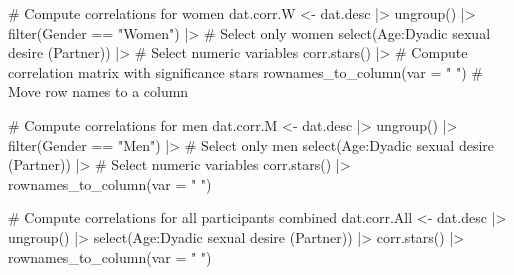 \documentclass[
  bookmarksnumbered]{article}
\newenvironment{Shaded}{\begin{snugshade}}{\end{snugshade}}
\newcommand{\AttributeTok}[1]{\textcolor[rgb]{0.80,0.80,0.80}{#1}}
\newcommand{\CommentTok}[1]{\textcolor[rgb]{0.50,0.62,0.50}{#1}}
\newcommand{\FunctionTok}[1]{\textcolor[rgb]{0.94,0.94,0.56}{#1}}
\newcommand{\NormalTok}[1]{\textcolor[rgb]{0.80,0.80,0.80}{#1}}
\newcommand{\OtherTok}[1]{\textcolor[rgb]{0.94,0.94,0.56}{#1}}
\newcommand{\SpecialCharTok}[1]{\textcolor[rgb]{0.86,0.64,0.64}{#1}}
\newcommand{\StringTok}[1]{\textcolor[rgb]{0.80,0.58,0.58}{#1}}
\begin{document}
\begin{Shaded}
\begin{Highlighting}[]
\CommentTok{\# Compute correlations for women}
\NormalTok{dat.corr.W }\OtherTok{\textless{}{-}}\NormalTok{ dat.desc }\SpecialCharTok{|\textgreater{}}
  \FunctionTok{ungroup}\NormalTok{() }\SpecialCharTok{|\textgreater{}}
  \FunctionTok{filter}\NormalTok{(Gender }\SpecialCharTok{==} \StringTok{"Women"}\NormalTok{) }\SpecialCharTok{|\textgreater{}} \CommentTok{\# Select only women}
  \FunctionTok{select}\NormalTok{(Age}\SpecialCharTok{:}\StringTok{\textasciigrave{}}\AttributeTok{Dyadic sexual desire (Partner)}\StringTok{\textasciigrave{}}\NormalTok{) }\SpecialCharTok{|\textgreater{}} \CommentTok{\# Select numeric variables}
  \FunctionTok{corr.stars}\NormalTok{() }\SpecialCharTok{|\textgreater{}} \CommentTok{\# Compute correlation matrix with significance stars}
  \FunctionTok{rownames\_to\_column}\NormalTok{(}\AttributeTok{var =} \StringTok{" "}\NormalTok{) }\CommentTok{\# Move row names to a column}

\CommentTok{\# Compute correlations for men}
\NormalTok{dat.corr.M }\OtherTok{\textless{}{-}}\NormalTok{ dat.desc }\SpecialCharTok{|\textgreater{}}
  \FunctionTok{ungroup}\NormalTok{() }\SpecialCharTok{|\textgreater{}}
  \FunctionTok{filter}\NormalTok{(Gender }\SpecialCharTok{==} \StringTok{"Men"}\NormalTok{) }\SpecialCharTok{|\textgreater{}} \CommentTok{\# Select only men}
  \FunctionTok{select}\NormalTok{(Age}\SpecialCharTok{:}\StringTok{\textasciigrave{}}\AttributeTok{Dyadic sexual desire (Partner)}\StringTok{\textasciigrave{}}\NormalTok{) }\SpecialCharTok{|\textgreater{}} \CommentTok{\# Select numeric variables}
  \FunctionTok{corr.stars}\NormalTok{() }\SpecialCharTok{|\textgreater{}}
  \FunctionTok{rownames\_to\_column}\NormalTok{(}\AttributeTok{var =} \StringTok{" "}\NormalTok{)}

\CommentTok{\# Compute correlations for all participants combined}
\NormalTok{dat.corr.All }\OtherTok{\textless{}{-}}\NormalTok{ dat.desc }\SpecialCharTok{|\textgreater{}}
  \FunctionTok{ungroup}\NormalTok{() }\SpecialCharTok{|\textgreater{}}
  \FunctionTok{select}\NormalTok{(Age}\SpecialCharTok{:}\StringTok{\textasciigrave{}}\AttributeTok{Dyadic sexual desire (Partner)}\StringTok{\textasciigrave{}}\NormalTok{) }\SpecialCharTok{|\textgreater{}}
  \FunctionTok{corr.stars}\NormalTok{() }\SpecialCharTok{|\textgreater{}}
  \FunctionTok{rownames\_to\_column}\NormalTok{(}\AttributeTok{var =} \StringTok{" "}\NormalTok{)}


\end{Highlighting}
\end{Shaded}
\end{document}
